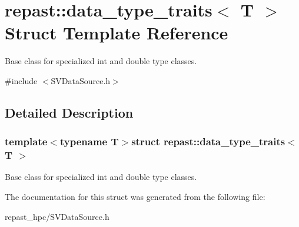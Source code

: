 \hypertarget{structrepast_1_1data__type__traits}{\section{repast\-:\-:data\-\_\-type\-\_\-traits$<$ T $>$ Struct Template Reference}
\label{structrepast_1_1data__type__traits}
}


Base class for specialized int and double type classes.  




{\ttfamily \#include $<$S\-V\-Data\-Source.\-h$>$}



\subsection{Detailed Description}
\subsubsection*{template$<$typename T$>$struct repast\-::data\-\_\-type\-\_\-traits$<$ T $>$}

Base class for specialized int and double type classes. 

The documentation for this struct was generated from the following file\-:\begin{DoxyCompactItemize}
\item 
repast\-\_\-hpc/S\-V\-Data\-Source.\-h\end{DoxyCompactItemize}
